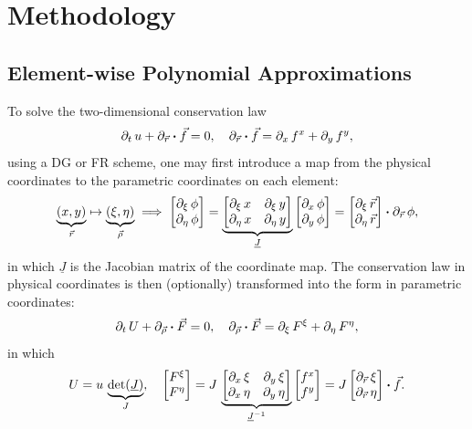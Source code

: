 \documentclass[10pt,draft]{article}
\begin{document}
\section{Methodology}
\subsection{Element-wise Polynomial Approximations}
To solve the two-dimensional conservation law
$$
\partial_{t}\,u+\partial_{\vec{r}}\vdot\vec{f}=0,\quad\partial_{\vec{r}}\vdot\vec{f}=\partial_{x}\,f^{x}+\partial_{y}\,f^{y},
$$
using a DG or FR scheme, one may first introduce a map from the physical coordinates to the parametric coordinates on each element:
$$
\underbrace{(x,y)}_{\vec{r}}\mapsto\underbrace{(\xi,\eta)}_{\vec{\rho}}
\implies
\begin{bmatrix}\partial_{\xi}\,\phi\\
\partial_{\eta}\,\phi
\end{bmatrix}=\underbrace{\begin{bmatrix}\partial_{\xi}\,x & \partial_{\xi}\,y\\
\partial_{\eta}\,x & \partial_{\eta}\,y
\end{bmatrix}}_{\underline{J}}\begin{bmatrix}\partial_{x}\,\phi\\
\partial_{y}\,\phi
\end{bmatrix}=\begin{bmatrix}\partial_{\xi}\,\vec{r}\\
\partial_{\eta}\,\vec{r}
\end{bmatrix}\vdot\partial_{\vec{r}}\,\phi,
$$
in which $\underline{J}$ is the Jacobian matrix of the coordinate map.
%
The conservation law in physical coordinates is then (optionally) transformed into the form in parametric coordinates:
$$
\partial_{t}\,U+\partial_{\vec{\rho}}\vdot\vec{F}=0,\quad\partial_{\vec{\rho}}\vdot\vec{F}=\partial_{\xi}\,F^{\xi}+\partial_{\eta}\,F^{\eta},
$$
in which
$$
U=u\,\underbrace{\det(\underline{J})}_{J},\quad\begin{bmatrix}F^{\xi}\\
F^{\eta}
\end{bmatrix}=J\,\underbrace{\begin{bmatrix}\partial_{x}\,\xi & \partial_{y}\,\xi\\
\partial_{x}\,\eta & \partial_{y}\,\eta
\end{bmatrix}}_{\underline{J}^{-1}}\begin{bmatrix}f^{x}\\
f^{y}
\end{bmatrix}=J\begin{bmatrix}\partial_{\vec{r}}\,\xi\\
\partial_{\vec{r}}\,\eta
\end{bmatrix}\vdot\vec{f}.
$$
\end{document}
